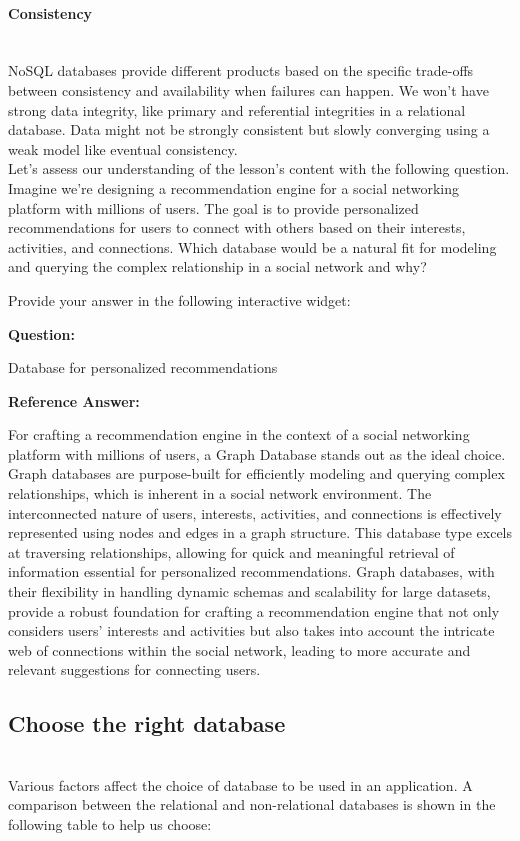 \paragraph{Consistency}\label{UN7D7jE-Qlx-6pi3XdtOw}
\\
NoSQL databases provide different products based on the specific trade-offs between consistency and availability when failures can happen. We won't have strong data integrity, like primary and referential integrities in a relational database. Data might not be strongly consistent but slowly converging using a weak model like eventual consistency.
\\
Let's assess our understanding of the lesson's content with the following question.
\\
Imagine we're designing a recommendation engine for a social networking platform with millions of users. The goal is to provide personalized recommendations for users to connect with others based on their interests, activities, and connections. Which database would be a natural fit for modeling and querying the complex relationship in a social network and why?

Provide your answer in the following interactive widget:

\textbf{Question:}

Database for personalized recommendations

\textbf{Reference Answer:}

For crafting a recommendation engine in the context of a social networking platform with millions of users, a Graph Database stands out as the ideal choice. Graph databases are purpose-built for efficiently modeling and querying complex relationships, which is inherent in a social network environment. The interconnected nature of users, interests, activities, and connections is effectively represented using nodes and edges in a graph structure. This database type excels at traversing relationships, allowing for quick and meaningful retrieval of information essential for personalized recommendations. Graph databases, with their flexibility in handling dynamic schemas and scalability for large datasets, provide a robust foundation for crafting a recommendation engine that not only considers users' interests and activities but also takes into account the intricate web of connections within the social network, leading to more accurate and relevant suggestions for connecting users.

\subsection{Choose the right database}\label{osJry6Ig2iAOetGpEijOG}
\\
Various factors affect the choice of database to be used in an application. A comparison between the relational and non-relational databases is shown in the following table to help us choose:

